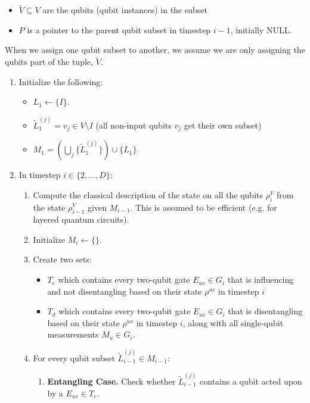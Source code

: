 \begin{itemize}
\item $\tilde{V} \subseteq V$ are the qubits (qubit instances) in the subset
\item $P$ is a pointer to the parent qubit subset in timestep ${i-1}$, initially \textsc{NULL}.
\end{itemize}

When we assign one qubit subset to another, we assume we are only assigning
the qubits part of the tuple, $\tilde{V}$.

\begin{enumerate}
\item
Initialize the following:
\begin{itemize}
\item
$L_1 \leftarrow \{ I \}$.
\item
$\tilde{L}^{(j)}_1 = v_j \in V \setminus I$ (all non-input qubits $v_j$ get their own subset)
\item
$M_1 = \left( \bigcup_j \{ \tilde{L}^{(j)}_1 \} \right) \cup \{ L_1 \} $.
\end{itemize}

\item
In timestep $i \in \{2, \ldots, D \}$:

\begin{enumerate}

\item
Compute the classical description of the state on all the qubits $\rho^{V}_i$
from the state $\rho^{V}_{i-1}$
given $M_{i-1}$.
This is assumed to be efficient (e.g. for layered quantum circuits). 
\item
Initialize $M_i \leftarrow \{\}$.
\item
Create two sets:
\begin{itemize}
\item $T_e$ which contains every two-qubit
gate $E_{uv} \in G_i$ that is influencing and not disentangling based on
their state $\rho^{uv}$ in timestep $i$
\item $T_d$ which contains every two-qubit
gate $E_{uv} \in G_i$ that is disentangling
 based on
their state $\rho^{uv}$ in timestep $i$,
along with all single-qubit measurements $M_u \in G_i$.
\end{itemize}

\item
For every qubit subset $\tilde{L}^{(j)}_{i-1} \in M_{i-1}$:

\begin{enumerate}
\item \textbf{Entangling Case.} Check whether $\tilde{L}^{(j)}_{i-1}$ contains a qubit acted upon by a
$E_{uv} \in T_e$.


\end{enumerate}
\end{enumerate}
\end{enumerate}
